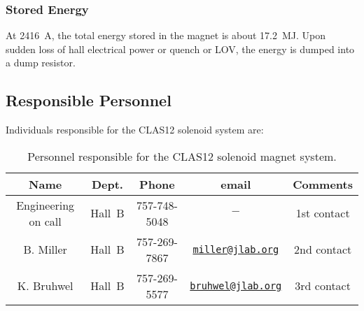 \subsubsection{Stored Energy}

At 2416~A, the total energy stored in the magnet is about 17.2~MJ. Upon sudden loss of hall 
electrical power or quench or LOV, the energy is dumped into a dump resistor.

\subsection{Responsible Personnel}

Individuals responsible for the CLAS12 solenoid system are:

\begin{table}[!htb]
\centering
\begin{tabular}{|c|c|c|c|c|} \hline
Name&Dept.&Phone&email&Comments \\ \hline
Engineering on call& Hall~B & 757-748-5048 &$-$& 1st contact \\ \hline
B. Miller          & Hall~B & 757-269-7867 &\href{mailto:miller@jlab.org}{\nolinkurl{miller@jlab.org}}&2nd contact \\ \hline
K. Bruhwel         & Hall~B & 757-269-5577 &\href{mailto:}{\nolinkurl{bruhwel@jlab.org}}&3rd contact \\ \hline
\end{tabular}
\caption{Personnel responsible for the CLAS12 solenoid magnet system.} 
\label{tb:solenoid}
\end{table}


